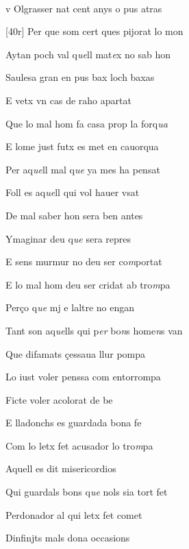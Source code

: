 \documentclass[12pt]{article}
\renewcommand{\espaiAbansEtiquetaPoema}{\vspace{0ex}}
\begin{document}
\begin{estrofa}

\espaiAbansEtiquetaPoema

\\

\end{estrofa}


\begin{estrofa}

 v Olgrasser nat cent anys o pus atras

 [40r] Per que som cert ques pijorat lo mon

 Aytan poch val q\textit{ue}ll mat\textit{e}x no sab hon

 Saulesa gran en pus bax loch baxas

 E vetx vn cas de raho apartat

 Que lo mal hom fa casa prop  la forq\textit{ua}

 E lome just futx es met en cauorqua

 Per aq\textit{ue}ll mal q\textit{ue} ya mes ha pensat

\end{estrofa}



\begin{estrofa}

 Foll es aq\textit{ue}ll qui vol hauer vsat

 De mal saber hon sera ben antes

 Ymaginar deu q\textit{ue} sera repres

 E sens murmur no deu ser co\textit{m}portat

 E lo mal hom deu ser cridat ab tro\textit{m}pa

 Per\c{c}o q\textit{ue} mj e laltre no engan

 Tant son aq\textit{ue}lls qui p\textit{er} bo\textit{n}s home\textit{n}s van

 Que difamats \c{c}essaua llur pompa

\end{estrofa}



\begin{estrofa}

 Lo iust voler penssa com entorrompa

 Ficte voler acolorat de be

 E lladonchs es guardada bona fe

 Com lo letx fet acusador lo tro\textit{m}pa

 Aquell es dit misericordios

 Qui guardals bons q\textit{ue} nols sia tort fet

 Perdonador al qui letx fet comet

 Dinfinjts mals dona occasions

\end{estrofa}
\end{document}
